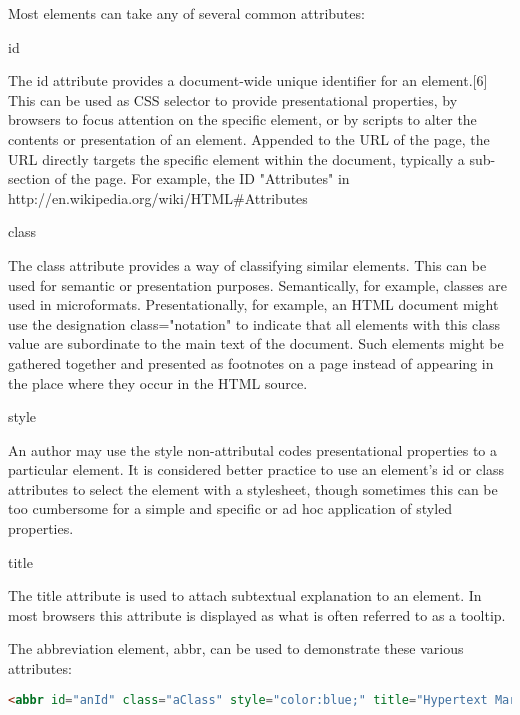 Most elements can take any of several common attributes:

\begin{compactitem}
\item id

The id attribute provides a document-wide unique identifier for an element.[6] This can be used as CSS selector to provide presentational properties, by browsers to focus attention on the specific element, or by scripts to alter the contents or presentation of an element. Appended to the URL of the page, the URL directly targets the specific element within the document, typically a sub-section of the page. For example, the ID "Attributes" in http://en.wikipedia.org/wiki/HTML\#Attributes

\item class

The class attribute provides a way of classifying similar elements. This can be used for semantic or presentation purposes. Semantically, for example, classes are used in microformats. Presentationally, for example, an HTML document might use the designation class="notation" to indicate that all elements with this class value are subordinate to the main text of the document. Such elements might be gathered together and presented as footnotes on a page instead of appearing in the place where they occur in the HTML source.

\item style

An author may use the style non-attributal codes presentational properties to a particular element. It is considered better practice to use an element’s id or class attributes to select the element with a stylesheet, though sometimes this can be too cumbersome for a simple and specific or ad hoc application of styled properties.

\item title 

The title attribute is used to attach subtextual explanation to an element. In most browsers this attribute is displayed as what is often referred to as a tooltip.

\end{compactitem}

The abbreviation element, abbr, can be used to demonstrate these various attributes:

\begin{lstlisting}[language=HTML]
<abbr id="anId" class="aClass" style="color:blue;" title="Hypertext Markup Language">HTML</abbr>
\end{lstlisting}

